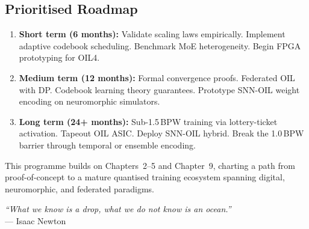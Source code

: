 \subsection{Prioritised Roadmap}
\begin{enumerate}
    \item \textbf{Short term (6 months):} Validate scaling laws empirically.
          Implement adaptive codebook scheduling. Benchmark MoE heterogeneity.
          Begin FPGA prototyping for OIL4.
    \item \textbf{Medium term (12 months):} Formal convergence proofs. Federated
          OIL with DP. Codebook learning theory guarantees. Prototype SNN-OIL
          weight encoding on neuromorphic simulators.
    \item \textbf{Long term (24+ months):} Sub-1.5\,BPW training via
          lottery-ticket activation. Tapeout OIL ASIC. Deploy SNN-OIL hybrid.
          Break the 1.0\,BPW barrier through temporal or ensemble encoding.
\end{enumerate}
This programme builds on Chapters~2--5 and Chapter~9, charting a path
from proof-of-concept to a mature quantised training ecosystem spanning
digital, neuromorphic, and federated paradigms.

\vfill
\begin{center}
\textit{``What we know is a drop, what we do not know is an ocean.''}\\
--- Isaac Newton
\end{center}